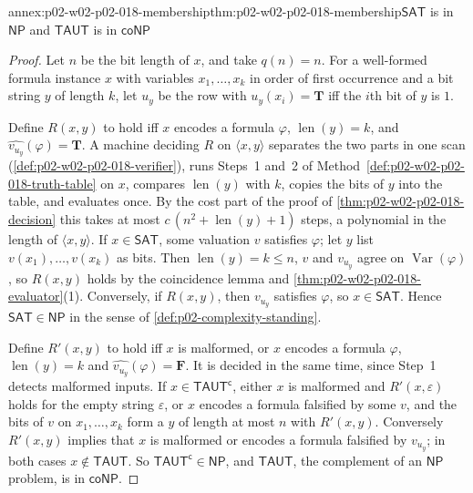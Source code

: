 \begin{annexitem}{annex:p02-w02-p02-018-membership}{thm:p02-w02-p02-018-membership}{\(\mathsf{SAT}\) is in \(\mathsf{NP}\) and \(\mathsf{TAUT}\) is in \(\mathsf{coNP}\)}
\begin{proof}
Let \(n\) be the bit length of \(x\), and take \(q(n)=n\).  For a
well-formed formula instance \(x\) with variables \(x_1,\ldots,x_k\) in order
of first occurrence and a bit string \(y\) of length \(k\), let \(u_y\) be the
row with \(u_y(x_i)=\mathbf T\) iff the \(i\)th bit of \(y\) is \(1\).

Define \(R(x,y)\) to hold iff \(x\) encodes a formula \(\varphi\),
\(\operatorname{len}(y)=k\), and \(\widehat{v_{u_y}}(\varphi)=\mathbf T\).  A machine
deciding \(R\) on \(\langle x,y\rangle\) separates the two parts in one scan
(\cref{def:p02-w02-p02-018-verifier}), runs Steps~1 and~2 of
Method~\ref{def:p02-w02-p02-018-truth-table} on \(x\), compares \(\operatorname{len}(y)\)
with \(k\), copies the bits of \(y\) into the table, and evaluates once.  By
the cost part of the proof of \cref{thm:p02-w02-p02-018-decision} this takes
at most \(c\,(n^2+\operatorname{len}(y)+1)\) steps, a polynomial in the length of
\(\langle x,y\rangle\).  If \(x\in\mathsf{SAT}\), some valuation \(v\)
satisfies \(\varphi\); let \(y\) list \(v(x_1),\ldots,v(x_k)\) as bits.  Then
\(\operatorname{len}(y)=k\leq n\), \(v\) and \(v_{u_y}\) agree on
\(\operatorname{Var}(\varphi)\), so \(R(x,y)\) holds by the coincidence
lemma and \cref{thm:p02-w02-p02-018-evaluator}(1).  Conversely, if
\(R(x,y)\), then \(v_{u_y}\) satisfies \(\varphi\), so \(x\in\mathsf{SAT}\).
Hence \(\mathsf{SAT}\in\mathsf{NP}\) in the sense of
\cref{def:p02-complexity-standing}.

Define \(R'(x,y)\) to hold iff \(x\) is malformed, or \(x\) encodes a formula
\(\varphi\), \(\operatorname{len}(y)=k\) and \(\widehat{v_{u_y}}(\varphi)=\mathbf F\).  It is
decided in the same time, since Step~1 detects malformed inputs.  If
\(x\in\mathsf{TAUT}^{\mathsf c}\), either \(x\) is malformed and
\(R'(x,\varepsilon)\) holds for the empty string \(\varepsilon\), or \(x\)
encodes a formula falsified by some \(v\), and the bits of \(v\) on
\(x_1,\ldots,x_k\) form a \(y\) of length at most \(n\) with \(R'(x,y)\).
Conversely \(R'(x,y)\) implies that \(x\) is malformed or encodes a formula
falsified by \(v_{u_y}\); in both cases \(x\notin\mathsf{TAUT}\).  So
\(\mathsf{TAUT}^{\mathsf c}\in\mathsf{NP}\), and \(\mathsf{TAUT}\), the
complement of an \(\mathsf{NP}\) problem, is in \(\mathsf{coNP}\).
\end{proof}
\end{annexitem}

